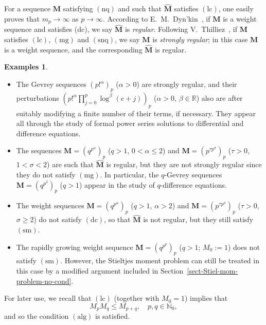 \documentclass[12pt,a4paper]{article}
\newcommand{\N}{\mathbb{N}}
\newcommand{\R}{\mathbb{R}}
\newcommand{\M}{{\boldsymbol{M}}}
\newcommand{\hM}{\widehat{{\boldsymbol{M}}}}
\newcommand{\lc}{\operatorname{(lc)}}
\newcommand{\dc}{\operatorname{(dc)}}
\newcommand{\mg}{\operatorname{(mg)}}
\newcommand{\alg}{\operatorname{(alg)}}
\newcommand{\nq}{\operatorname{(nq)}}
\newcommand{\snq}{\operatorname{(snq)}}
\newcommand{\sm}{\operatorname{(sm)}}
\theoremstyle{plain}
\theoremstyle{definition}
\newtheorem{examples}[theorem]{Examples}
\numberwithin{equation}{section}
\begin{document}
For a sequence $\M$ satisfying $\nq$ and such that $\hM$ satisfies $\lc$, one easily proves that $m_p \rightarrow \infty$ as $p \to \infty$.
According to E.~M.~Dyn'kin~\cite{Dynkin80}, if $\M$ is a weight sequence and satisfies (dc), we say $\hM$ is \emph{regular}. Following V.~Thilliez~\cite{Thilliez03}, if $\M$ satisfies $\lc$, $\mg$ and $\snq$, we say $\M$ is \emph{strongly regular}; in this case $\M$ is a weight sequence, and the corresponding $\hM$ is regular.

\begin{examples}
\begin{itemize}
\item[(i)] The Gevrey sequences $(p!^{\alpha})_{p}$ ($\alpha>0$) are strongly regular, and their perturbations $(p!^{\alpha}\prod_{j=0}^p\log^{\beta}(e+j))_{p}$ ($\alpha>0$, $\beta\in\R$) also are after suitably modifying a finite number of their terms, if necessary. They appear all through the study of formal power series solutions to differential and difference equations.
\item[(ii)] The sequences $\M=(q^{p^\alpha})_{p}$ ($q>1$, $0<\alpha\le 2$) and $\M=(p^{\tau p^\sigma})_{p}$ ($\tau>0$, $1<\sigma<2$) are such that $\hM$ is regular, but they are not strongly regular since they do not satisfy $\mg$. In particular, the $q$-Gevrey sequences $\M=(q^{p^2})_{p}$ ($q>1$) appear in the study of $q$-difference equations.
\item[(iii)] The weight sequences $\M=(q^{p^\alpha})_{p}$ ($q>1$, $\alpha>2$) and $\M=(p^{\tau p^\sigma})_{p}$ ($\tau>0$, $\sigma\ge 2$) do not satisfy $\dc$, so that $\hM$ is not regular, but they still satisfy $\sm$.
\item[(iv)] The rapidly growing weight sequence $\M=(q^{p^p})_{p}$ ($q>1$; $M_0:=1$) does not satisfy $\sm$. However, the Stieltjes moment problem can still be treated in this case by a modified argument included in Section~\ref{sect-Stiel-mom-problem-no-cond}.
\end{itemize}

\end{examples}

For later use, we recall that $\lc$ (together with $M_0=1$) implies that
\begin{equation}\label{eq-conseq-lc-prod}
M_pM_q\le M_{p+q},\quad p,q\in\N_0,
\end{equation}
and so the condition $\alg$ is satisfied.
\end{document}
